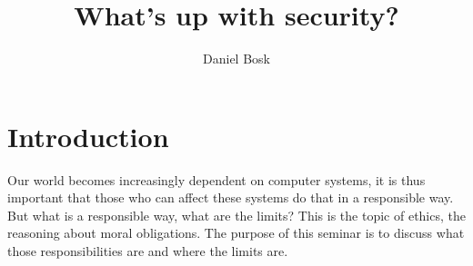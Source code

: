 \title{%
  What's up with security?
}
\author{Daniel Bosk}


\mode*

\begin{abstract}
  
\end{abstract}


\section{Introduction}

Our world becomes increasingly dependent on computer systems, it is thus 
important that those who can affect these systems do that in a responsible 
way.
But what is a responsible way, what are the limits?
This is the topic of ethics, the reasoning about moral obligations.
The purpose of this seminar is to discuss what those responsibilities are and 
where the limits are.



